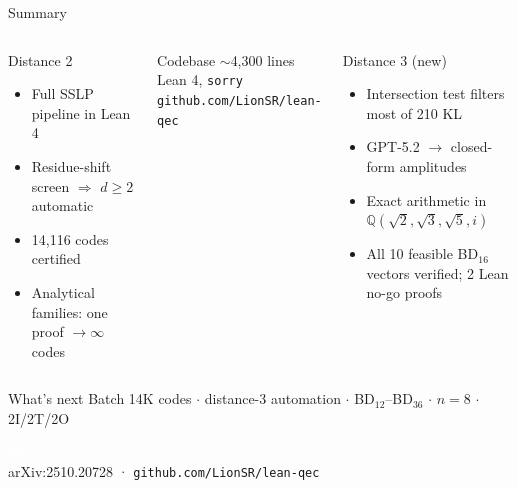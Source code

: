 \documentclass[aspectratio=169,t]{beamer}
\newcommand{\QQ}{\mathbb{Q}}
\newcommand{\code}[1]{\texttt{\small #1}}
\begin{document}
\begin{frame}{Summary}

\begin{columns}[T]
\begin{block}{Distance 2}
\begin{itemize}\setlength\itemsep{0pt}
\item Full SSLP pipeline in Lean 4
\item Residue-shift screen $\Rightarrow$ $d{\geq}2$ automatic
\item 14,116 codes certified
\item Analytical families: one proof $\to \infty$ codes
\end{itemize}
\end{block}

\begin{exampleblock}{Codebase}
${\sim}$4,300 lines Lean 4, \code{sorry}\\
\code{github.com/LionSR/lean-qec}
\end{exampleblock}

\begin{block}{Distance 3 (new)}
\begin{itemize}\setlength\itemsep{0pt}
\item Intersection test filters most of 210 KL
\item GPT-5.2 $\to$ closed-form amplitudes
\item Exact arithmetic in $\QQ(\sqrt{2},\sqrt{3},\sqrt{5},i)$
\item All 10 feasible BD$_{16}$ vectors verified; 2 Lean no-go proofs
\end{itemize}
\end{block}
\end{columns}

\vspace{0.2em}
\begin{alertblock}{What's next}
{\scriptsize Batch 14K codes\; $\cdot$\; distance-3 automation\; $\cdot$\;
BD$_{12}$--BD$_{36}$\; $\cdot$\; $n{=}8$\; $\cdot$\; 2I/2T/2O}
\end{alertblock}
\end{frame}

{
\begin{frame}[standout]
  \textcolor{white}{\large Thank you}\\
  \textcolor{Ice}{\normalsize
    arXiv:2510.20728 \quad·\quad
    \texttt{github.com/LionSR/lean-qec}}
\end{frame}
}
\end{document}
